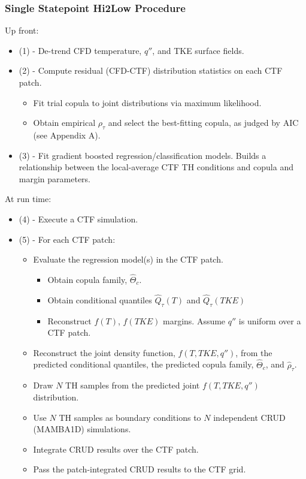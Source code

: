 \documentclass[t, pdftex]{beamer}
\begin{document}
\begin{frame}[shrink=20]
\frametitle{Single Statepoint Hi2Low Procedure}
Up front:
\begin{itemize}
\item (1) - De-trend CFD temperature, $q''$, and TKE surface fields.	
\item (2) - Compute residual (CFD-CTF) distribution statistics on each CTF patch.
	\begin{itemize}
	\item  Fit trial copula to joint distributions via maximum likelihood. 
	\item  Obtain empirical $\rho_\tau$ and select the best-fitting copula, as judged by AIC (see Appendix A). 
	\end{itemize}
\item (3) - Fit gradient boosted regression/classification models.  Builds a relationship between the local-average CTF TH conditions and copula and margin parameters.
\end{itemize}
At run time:
\begin{itemize}
\item (4) - Execute a CTF simulation.
\item (5) - For each CTF patch:
\begin{itemize}
\item Evaluate the regression model(s) in the CTF patch.
	\begin{itemize}
	\item  Obtain copula family, $\hat \Theta_c$.
	\item  Obtain conditional quantiles $\hat Q_\tau(T)$ and $\hat Q_\tau(TKE)$ 
	\item  Reconstruct $f(T)$, $f(TKE)$ margins. Assume $q''$ is uniform over a CTF patch.
	\end{itemize}
\item Reconstruct the joint density function, $f(T, TKE, q'')$, from the predicted conditional quantiles, the predicted copula family, $\hat \Theta_c$, and $\hat \rho_\tau$.  
\item Draw $N$ TH samples from the predicted joint $f(T, TKE, q'')$ distribution.  
\item Use $N$ TH samples as boundary conditions to $N$ independent CRUD (MAMBA1D) simulations.
\item Integrate CRUD results over the CTF patch.
\item Pass the patch-integrated CRUD results to the CTF grid.
\end{itemize}
\end{itemize}
\end{frame}
\end{document}
